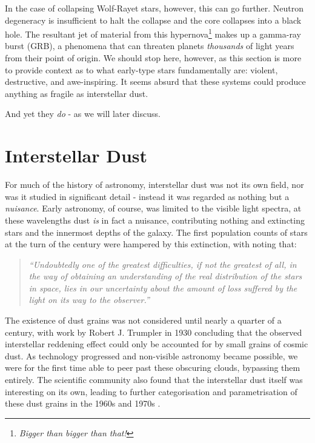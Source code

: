 In the case of collapsing Wolf-Rayet stars, however, this can go further.
Neutron degeneracy is insufficient to halt the collapse and the core collapses into a black hole.
The resultant jet of material from this hypernova\footnote{\emph{Bigger than bigger than that!}} makes up a gamma-ray burst (GRB), a phenomena that can threaten planets \emph{thousands} of light years from their point of origin.
We should stop here, however, as this section is more to provide context as to what early-type stars fundamentally are: violent, destructive, and awe-inspiring.
It seems absurd that these systems could produce anything as fragile as interstellar dust.

And yet they \emph{do} - as we will later discuss.

\section{Interstellar Dust}
\label{sec:dust}

For much of the history of astronomy, interstellar dust was not its own field, nor was it studied in significant detail - instead it was regarded as nothing but a \emph{nuisance}.
Early astronomy, of course, was limited to the visible light spectra, at these wavelengths dust \emph{is} in fact a nuisance, contributing nothing and extincting stars and the innermost depths of the galaxy.
The first population counts of stars at the turn of the  century were hampered by this extinction, with \textcite{kapteynAbsorptionLightSpace1909} noting that:

\begin{quote}
  \textit{
    ``Undoubtedly one of the greatest difficulties, if not the greatest of all, in the way of obtaining an understanding of the real distribution of the stars in space, lies in our uncertainty about the amount of loss suffered by the light on its way to the observer.''
  }
\end{quote}

\noindent
The existence of dust grains was not considered until nearly a quarter of a century, with work by Robert J. Trumpler in 1930 concluding that the observed interstellar reddening effect could only be accounted for by small grains of cosmic dust.
As technology progressed and non-visible astronomy became possible, we were for the first time able to peer past these obscuring clouds, bypassing them entirely.
The scientific community also found that the interstellar dust itself was interesting on its own, leading to further categorisation and parametrisation of these dust grains in the 1960s and 1970s
\parencite[4-13]{whittetDustGalacticEnvironment2002}.

